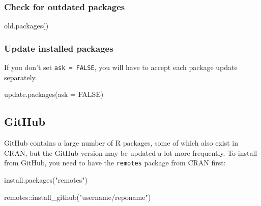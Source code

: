 \documentclass[
]{book}
\newenvironment{Shaded}{\begin{snugshade}}{\end{snugshade}}
\newcommand{\AttributeTok}[1]{\textcolor[rgb]{0.77,0.63,0.00}{#1}}
\newcommand{\ConstantTok}[1]{\textcolor[rgb]{0.00,0.00,0.00}{#1}}
\newcommand{\FunctionTok}[1]{\textcolor[rgb]{0.00,0.00,0.00}{#1}}
\newcommand{\NormalTok}[1]{#1}
\newcommand{\SpecialCharTok}[1]{\textcolor[rgb]{0.00,0.00,0.00}{#1}}
\newcommand{\StringTok}[1]{\textcolor[rgb]{0.31,0.60,0.02}{#1}}
\begin{document}
\hypertarget{check-for-outdated-packages}{%
\subsubsection{Check for outdated packages}\label{check-for-outdated-packages}}

\begin{Shaded}
\begin{Highlighting}[]
\FunctionTok{old.packages}\NormalTok{()}
\end{Highlighting}
\end{Shaded}

\hypertarget{update-installed-packages}{%
\subsubsection{Update installed packages}\label{update-installed-packages}}

If you don't set \texttt{ask\ =\ FALSE}, you will have to accept each package update separately.

\begin{Shaded}
\begin{Highlighting}[]
\FunctionTok{update.packages}\NormalTok{(}\AttributeTok{ask =} \ConstantTok{FALSE}\NormalTok{)}
\end{Highlighting}
\end{Shaded}

\hypertarget{github}{%
\subsection{GitHub}\label{github}}

GitHub contains a large number of R packages, some of which also exist in CRAN, but the GitHub version may be updated a lot more frequently. To install from GitHub, you need to have the \texttt{remotes} package from CRAN first:

\begin{Shaded}
\begin{Highlighting}[]
\FunctionTok{install.packages}\NormalTok{(}\StringTok{"remotes"}\NormalTok{)}
\end{Highlighting}
\end{Shaded}

\begin{Shaded}
\begin{Highlighting}[]
\NormalTok{remotes}\SpecialCharTok{::}\FunctionTok{install\_github}\NormalTok{(}\StringTok{"username/reponame"}\NormalTok{)}
\end{Highlighting}
\end{Shaded}
\end{document}
